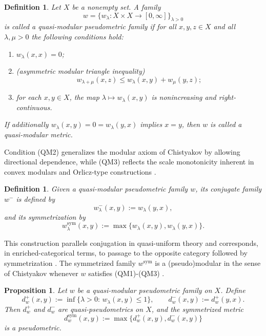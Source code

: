 \documentclass[preprint,12pt]{elsarticle}
\newtheorem{proposition}[theorem]{Proposition}
\newtheorem{definition}[theorem]{Definition}
\begin{document}
\begin{definition}
\label{def:quasi-modular-family}
Let $X$ be a nonempty set.
A family
\[
w=\{w_\lambda:X\times X\to[0,\infty]\}_{\lambda>0}
\]
is called a \emph{quasi-modular pseudometric family} if for all
$x,y,z\in X$ and all $\lambda,\mu>0$ the following conditions hold:
\begin{enumerate}
\item[(QM1)] $w_\lambda(x,x)=0$;
\item[(QM2)] \emph{(asymmetric modular triangle inequality)}
\[
w_{\lambda+\mu}(x,z)\le w_\lambda(x,y)+w_\mu(y,z);
\]
\item[(QM3)] for each $x,y\in X$, the map
$\lambda\mapsto w_\lambda(x,y)$ is nonincreasing and right-continuous.
\end{enumerate}
If additionally $w_\lambda(x,y)=0=w_\lambda(y,x)$ implies $x=y$, then
$w$ is called a \emph{quasi-modular metric}.
\end{definition}

\noindent
Condition \textnormal{(QM2)} generalizes the modular axiom of Chistyakov
\cite{Chistyakov2010} by allowing directional dependence, while
\textnormal{(QM3)} reflects the scale monotonicity inherent in convex
modulars and Orlicz-type constructions
\cite{Chistyakov2015,Musielak1983}.


\begin{definition}
\label{def:conjugate-symmetrized}
Given a quasi-modular pseudometric family $w$, its
\emph{conjugate family} $w^{-}$ is defined by
\[
w^{-}_\lambda(x,y):=w_\lambda(y,x),
\]
and its \emph{symmetrization} by
\[
w^{\mathrm{sym}}_\lambda(x,y)
:=\max\{w_\lambda(x,y),w_\lambda(y,x)\}.
\]
\end{definition}

\noindent
This construction parallels conjugation in quasi-uniform theory
\cite{FletcherLindgren,Kunzi2001} and corresponds, in enriched-categorical
terms, to passage to the opposite category followed by symmetrization
\cite{Kelly1982,Lawvere1973}.
The symmetrized family $w^{\mathrm{sym}}$ is a (pseudo)modular in the
sense of Chistyakov whenever $w$ satisfies \textnormal{(QM1)-(QM3)}
\cite{Majozi2025}.


\begin{proposition}
\label{prop:induced-quasimetrics}
Let $w$ be a quasi-modular pseudometric family on $X$.
Define
\[
d_w^{+}(x,y)
:=\inf\{\lambda>0:\, w_\lambda(x,y)\le 1\},
\qquad
d_w^{-}(x,y):=d_w^{+}(y,x).
\]
Then $d_w^{+}$ and $d_w^{-}$ are quasi-pseudometrics on $X$, and the
symmetrized metric
\[
d_w^{\mathrm{sym}}(x,y)
:=\max\{d_w^{+}(x,y),d_w^{-}(x,y)\}
\]
is a pseudometric.
\end{proposition}
\end{document}
